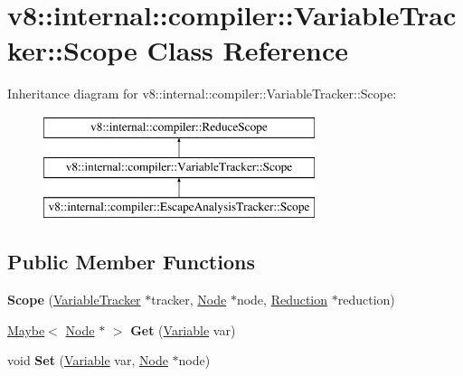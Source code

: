 \hypertarget{classv8_1_1internal_1_1compiler_1_1VariableTracker_1_1Scope}{}\section{v8\+:\+:internal\+:\+:compiler\+:\+:Variable\+Tracker\+:\+:Scope Class Reference}
\label{classv8_1_1internal_1_1compiler_1_1VariableTracker_1_1Scope}
Inheritance diagram for v8\+:\+:internal\+:\+:compiler\+:\+:Variable\+Tracker\+:\+:Scope\+:\begin{figure}[H]
\begin{center}
\leavevmode
\includegraphics[height=3.000000cm]{classv8_1_1internal_1_1compiler_1_1VariableTracker_1_1Scope}
\end{center}
\end{figure}
\subsection*{Public Member Functions}
\begin{DoxyCompactItemize}
\item 
\mbox{\label{classv8_1_1internal_1_1compiler_1_1VariableTracker_1_1Scope_a3e85270e6daaf044134caf39168b1ad6}} 
{\bfseries Scope} (\mbox{\hyperlink{classv8_1_1internal_1_1compiler_1_1VariableTracker}{Variable\+Tracker}} $\ast$tracker, \mbox{\hyperlink{classv8_1_1internal_1_1compiler_1_1Node}{Node}} $\ast$node, \mbox{\hyperlink{classv8_1_1internal_1_1compiler_1_1EffectGraphReducer_1_1Reduction}{Reduction}} $\ast$reduction)
\item 
\mbox{\label{classv8_1_1internal_1_1compiler_1_1VariableTracker_1_1Scope_a68dd0f8584af3b64b8d0da9cc20badd9}} 
\mbox{\hyperlink{classv8_1_1Maybe}{Maybe}}$<$ \mbox{\hyperlink{classv8_1_1internal_1_1compiler_1_1Node}{Node}} $\ast$ $>$ {\bfseries Get} (\mbox{\hyperlink{classv8_1_1internal_1_1compiler_1_1Variable}{Variable}} var)
\item 
\mbox{\label{classv8_1_1internal_1_1compiler_1_1VariableTracker_1_1Scope_aed59fe73303f5306babb0810cf39c6d3}} 
void {\bfseries Set} (\mbox{\hyperlink{classv8_1_1internal_1_1compiler_1_1Variable}{Variable}} var, \mbox{\hyperlink{classv8_1_1internal_1_1compiler_1_1Node}{Node}} $\ast$node)
\end{DoxyCompactItemize}
